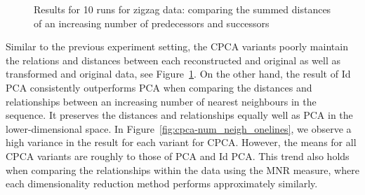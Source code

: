 \documentclass[pdftex,12pt,a4paper]{report}
\begin{document}
\begin{figure}[htb!]
    \caption{Results for 10 runs for zigzag data: comparing the summed distances of an increasing number of predecessors and successors}\label{fig:cpca-num-neigh-zigzag}
\end{figure}

Similar to the previous experiment setting, the CPCA variants poorly maintain the relations and distances between each reconstructed and original as well as transformed and original data, see Figure~\ref{fig:cpca-num-neigh-zigzag}.
On the other hand, the result of Id PCA consistently outperforms PCA when comparing the distances and relationships between an increasing number of nearest neighbours in the sequence.
It preserves the distances and relationships equally well as PCA in the lower-dimensional space.
In Figure~\ref{fig:cpca-num_neigh_onelines}, we observe a high variance in the result for each variant for CPCA.
However, the means for all CPCA variants are roughly to those of PCA and Id PCA.
This trend also holds when comparing the relationships within the data using the MNR measure, where each dimensionality reduction method performs approximately similarly.
\end{document}
